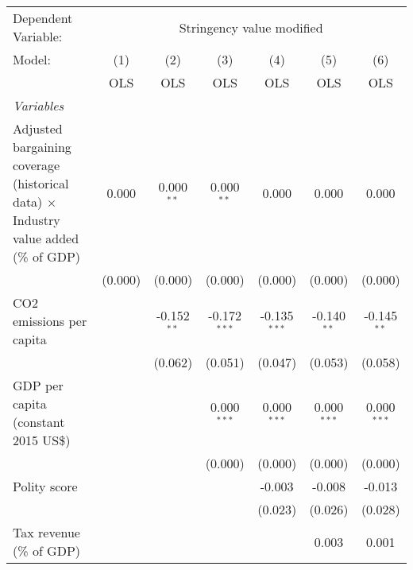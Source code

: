 
\begingroup
\centering
\begin{tabular}{lcccccc}
   \toprule
   Dependent Variable: & \multicolumn{6}{c}{Stringency value modified}\\
   Model:                                                                                     & (1)     & (2)           & (3)            & (4)            & (5)           & (6)\\  
                                                                                              &  OLS    & OLS           & OLS            & OLS            & OLS           & OLS\\  
   \midrule
   \emph{Variables}\\
   Adjusted bargaining coverage (historical data) $\times$ Industry value added (\% of GDP)   & 0.000   & 0.000$^{**}$  & 0.000$^{**}$   & 0.000          & 0.000         & 0.000\\   
                                                                                              & (0.000) & (0.000)       & (0.000)        & (0.000)        & (0.000)       & (0.000)\\   
   CO2 emissions per capita                                                                   &         & -0.152$^{**}$ & -0.172$^{***}$ & -0.135$^{***}$ & -0.140$^{**}$ & -0.145$^{**}$\\   
                                                                                              &         & (0.062)       & (0.051)        & (0.047)        & (0.053)       & (0.058)\\   
   GDP per capita (constant 2015 US\$)                                                        &         &               & 0.000$^{***}$  & 0.000$^{***}$  & 0.000$^{***}$ & 0.000$^{***}$\\   
                                                                                              &         &               & (0.000)        & (0.000)        & (0.000)       & (0.000)\\   
   Polity score                                                                               &         &               &                & -0.003         & -0.008        & -0.013\\   
                                                                                              &         &               &                & (0.023)        & (0.026)       & (0.028)\\   
   Tax revenue (\% of GDP)                                                                    &         &               &                &                & 0.003         & 0.001\\   

\end{tabular}
